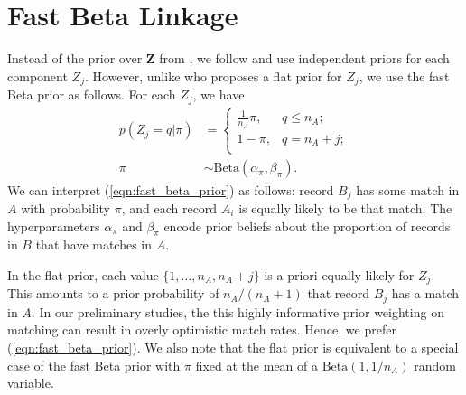 \documentclass[ba]{imsart}
\begin{document}
\section{Fast Beta Linkage}
\label{sec:fast-beta-linkage}

Instead of the prior over $\bm{Z}$ from \cite{sadinle_bayesian_2017}, we follow \cite{wortman2019} and use independent priors for each component $Z_j$. However, unlike \cite{wortman2019} who proposes a flat prior for $Z_j$, we use the fast Beta prior as follows. For each $Z_j$, we have
\begin{subequations}
\begin{align}
	p(Z_j = q| \pi) &= \begin{cases} 
	\frac{1}{n_A}\pi,  & q \leq n_A;\\
	1-\pi, &  q  = n_A + j;  \\
\end{cases} \label{eqn:fast_beta_prior}  \\
\pi &\sim \text{Beta}(\alpha_{\pi}, \beta_{\pi}) \label{eqn:fast_beta_prior2}.
\end{align}
\end{subequations}
We can interpret (\ref{eqn:fast_beta_prior}) as follows: record $B_j$ has some match in $A$ with probability $\pi$, and each record $A_i$ is equally likely to be that match. The hyperparameters $\alpha_{\pi}$ and $\beta_{\pi}$ encode prior beliefs about  the proportion of records in $B$ that have matches in $A.$ 

In the \cite{wortman2019} flat prior, each value $\{1, \ldots, n_A, n_A +j\}$ is a priori equally likely for $Z_j$. This amounts to a prior probability of $n_A / (n_A + 1)$ that record $B_j$ has a match in $A$. In our preliminary studies, the this highly informative prior weighting on matching can result in overly optimistic match rates. Hence, we prefer (\ref{eqn:fast_beta_prior}). We also note that the flat prior is equivalent to a special case of the fast Beta prior with $\pi$ fixed at the mean of a $\text{Beta}\left(1, 1 / n_A \right)$ random variable.
\end{document}
